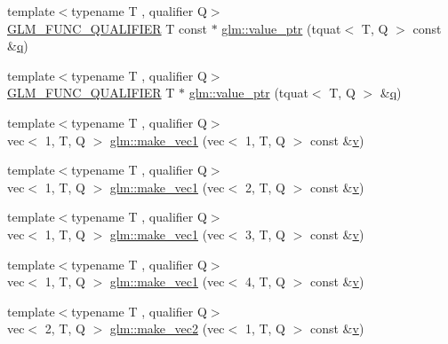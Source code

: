 \begin{DoxyCompactItemize}
\item 
{\footnotesize template$<$typename T , qualifier Q$>$ }\\\hyperlink{setup_8hpp_a33fdea6f91c5f834105f7415e2a64407}{G\+L\+M\+\_\+\+F\+U\+N\+C\+\_\+\+Q\+U\+A\+L\+I\+F\+I\+ER} T const  $\ast$ \hyperlink{group__gtc__type__ptr_ga8d5728b67f88d8fcce096db3885d74f0}{glm\+::value\+\_\+ptr} (tquat$<$ T, Q $>$ const \&\hyperlink{_s_d_l__opengl_8h_a8fc1e7b9baaae687804c7eed46ca09c6}{q})
\item 
{\footnotesize template$<$typename T , qualifier Q$>$ }\\\hyperlink{setup_8hpp_a33fdea6f91c5f834105f7415e2a64407}{G\+L\+M\+\_\+\+F\+U\+N\+C\+\_\+\+Q\+U\+A\+L\+I\+F\+I\+ER} T $\ast$ \hyperlink{group__gtc__type__ptr_ga38e914875e288a10c99139869be4426a}{glm\+::value\+\_\+ptr} (tquat$<$ T, Q $>$ \&\hyperlink{_s_d_l__opengl_8h_a8fc1e7b9baaae687804c7eed46ca09c6}{q})
\item 
{\footnotesize template$<$typename T , qualifier Q$>$ }\\vec$<$ 1, T, Q $>$ \hyperlink{group__gtc__type__ptr_ga4135f03f3049f0a4eb76545c4967957c}{glm\+::make\+\_\+vec1} (vec$<$ 1, T, Q $>$ const \&\hyperlink{_s_d_l__opengl_8h_a10a82eabcb59d2fcd74acee063775f90}{v})
\item 
{\footnotesize template$<$typename T , qualifier Q$>$ }\\vec$<$ 1, T, Q $>$ \hyperlink{group__gtc__type__ptr_ga13c92b81e55f201b052a6404d57da220}{glm\+::make\+\_\+vec1} (vec$<$ 2, T, Q $>$ const \&\hyperlink{_s_d_l__opengl_8h_a10a82eabcb59d2fcd74acee063775f90}{v})
\item 
{\footnotesize template$<$typename T , qualifier Q$>$ }\\vec$<$ 1, T, Q $>$ \hyperlink{group__gtc__type__ptr_ga3c23cc74086d361e22bbd5e91a334e03}{glm\+::make\+\_\+vec1} (vec$<$ 3, T, Q $>$ const \&\hyperlink{_s_d_l__opengl_8h_a10a82eabcb59d2fcd74acee063775f90}{v})
\item 
{\footnotesize template$<$typename T , qualifier Q$>$ }\\vec$<$ 1, T, Q $>$ \hyperlink{group__gtc__type__ptr_ga6af06bb60d64ca8bcd169e3c93bc2419}{glm\+::make\+\_\+vec1} (vec$<$ 4, T, Q $>$ const \&\hyperlink{_s_d_l__opengl_8h_a10a82eabcb59d2fcd74acee063775f90}{v})
\item 
{\footnotesize template$<$typename T , qualifier Q$>$ }\\vec$<$ 2, T, Q $>$ \hyperlink{group__gtc__type__ptr_ga8476d0e6f1b9b4a6193cc25f59d8a896}{glm\+::make\+\_\+vec2} (vec$<$ 1, T, Q $>$ const \&\hyperlink{_s_d_l__opengl_8h_a10a82eabcb59d2fcd74acee063775f90}{v})

\end{DoxyCompactItemize}
